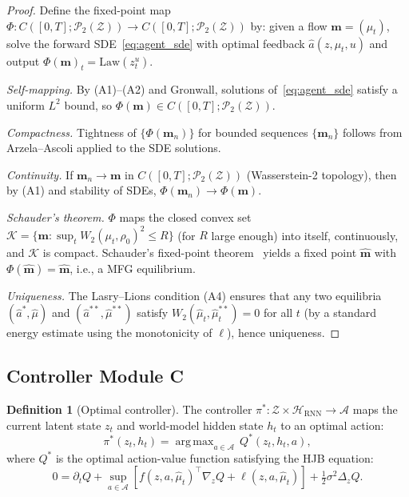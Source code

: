 \documentclass[12pt,a4paper]{article}
\theoremstyle{plain}
\theoremstyle{definition}
\newtheorem{definition}[theorem]{Definition}
\newcommand{\Hil}{\mathcal{H}}
\newcommand{\Z}{\mathcal{Z}}
\newcommand{\A}{\mathcal{A}}
\newcommand{\Prob}{\mathcal{P}}
\newcommand{\Law}{\mathrm{Law}}
\newcommand{\1}{\mathbbm{1}}
\newcommand{\WD}[2]{W_2(#1,#2)}  %
\DeclareMathOperator*{\argmax}{arg\,max}
\begin{document}
\begin{proof}
Define the fixed-point map $\Phi: C([0,T];\Prob_2(\Z)) \to C([0,T];\Prob_2(\Z))$
by: given a flow $\mathbf{m} = (\mu_t)$, solve the forward SDE~\eqref{eq:agent_sde}
with optimal feedback $\hat{a}(z,\mu_t,u)$ and output $\Phi(\mathbf{m})_t = \Law(z^u_t)$.

\textit{Self-mapping.} By (A1)--(A2) and Gronwall, solutions of~\eqref{eq:agent_sde}
satisfy a uniform $L^2$ bound, so $\Phi(\mathbf{m}) \in C([0,T];\Prob_2(\Z))$.

\textit{Compactness.} Tightness of $\{\Phi(\mathbf{m}_n)\}$ for bounded sequences
$\{\mathbf{m}_n\}$ follows from Arzela--Ascoli applied to the SDE solutions.

\textit{Continuity.} If $\mathbf{m}_n \to \mathbf{m}$ in $C([0,T];\Prob_2(\Z))$
(Wasserstein-2 topology), then by (A1) and stability of SDEs,
$\Phi(\mathbf{m}_n) \to \Phi(\mathbf{m})$.

\textit{Schauder's theorem.} $\Phi$ maps the closed convex set
$\mathcal{K} = \{\mathbf{m}: \sup_t\WD{\mu_t}{\rho_0}^2 \leq R\}$
(for $R$ large enough) into itself, continuously, and $\mathcal{K}$
is compact. Schauder's fixed-point theorem~\citep{Evans2010} yields
a fixed point $\hat{\mathbf{m}}$ with $\Phi(\hat{\mathbf{m}}) = \hat{\mathbf{m}}$,
i.e., a MFG equilibrium.

\textit{Uniqueness.} The Lasry--Lions condition (A4) ensures that any
two equilibria $(\hat{a}^*, \hat{\mu})$ and $(\hat{a}^{**},\hat{\mu}^{**})$ satisfy
$\WD{\hat{\mu}_t}{\hat{\mu}^{**}_t} = 0$ for all $t$ (by a standard
energy estimate using the monotonicity of $\ell$), hence uniqueness.
\end{proof}

\subsection{Controller Module C}

\begin{definition}[Optimal controller]
The controller $\pi^*: \Z \times \Hil_\mathrm{RNN} \to \A$ maps the current
latent state $z_t$ and world-model hidden state $h_t$ to an optimal action:
\[
\pi^*(z_t, h_t) = \argmax_{a\in\A}\, Q^*(z_t, h_t, a),
\]
where $Q^*$ is the optimal action-value function satisfying the HJB equation:
\[
0 = \partial_t Q + \sup_{a\in\A}\left[
    f(z,a,\hat{\mu}_t)^\top \nabla_z Q + \ell(z,a,\hat{\mu}_t)
  \right]
  + \tfrac{1}{2}\sigma^2\Delta_z Q.
\]
\end{definition}
\end{document}
